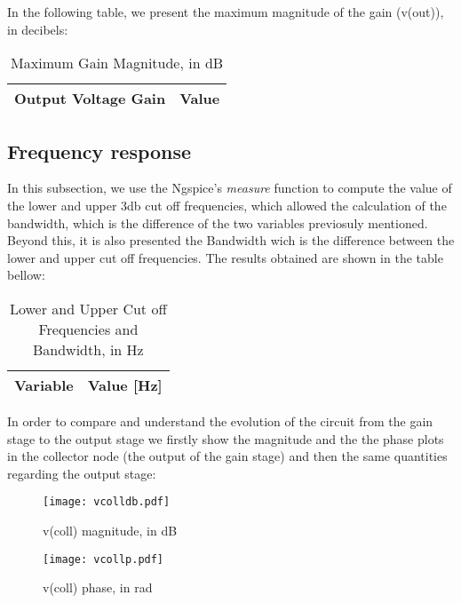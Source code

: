  In the following table, we present the maximum magnitude of the gain (v(out)), in decibels:
 
\begin{table}[H]
  \centering
  \begin{tabular}{|l|r|}
    \hline    
    {\bf Output Voltage Gain} & {\bf Value} \\ \hline
    
  \end{tabular}
  \caption{Maximum Gain Magnitude, in dB}
  \label{tab:gain}
\end{table}



\subsection{Frequency response}
\label{frequency_response}
In this subsection, we use the Ngspice's \textit{measure} function to compute the value of the lower and upper 3db cut off frequencies, which allowed the calculation of the bandwidth, which is the difference of the two variables previosuly mentioned. Beyond this, it is also presented the Bandwidth wich is the difference between the lower and upper cut off frequencies. The results obtained are shown in the table bellow:

\begin{table}[H]
  \centering
  \begin{tabular}{|l|r|}
    \hline    
    {\bf Variable} & {\bf Value [Hz]} \\ \hline
    
  \end{tabular}
  \caption{Lower and Upper Cut off Frequencies and Bandwidth, in Hz}
  \label{tab:frequency_response}
\end{table}

In order to compare and understand the evolution of the circuit from the gain stage to the output stage we firstly show the magnitude and the the phase plots in the collector node (the output of the gain stage) and then the same quantities regarding the output stage:

\begin{figure}[H] \centering
\texttt{[image: vcolldb.pdf]}
\caption{v(coll) magnitude, in dB}
\label{fig:voutdb}
\end{figure}
 
 
\begin{figure}[H] \centering
\texttt{[image: vcollp.pdf]}
\caption{v(coll) phase, in rad}
\label{fig:voutp}
\end{figure}


